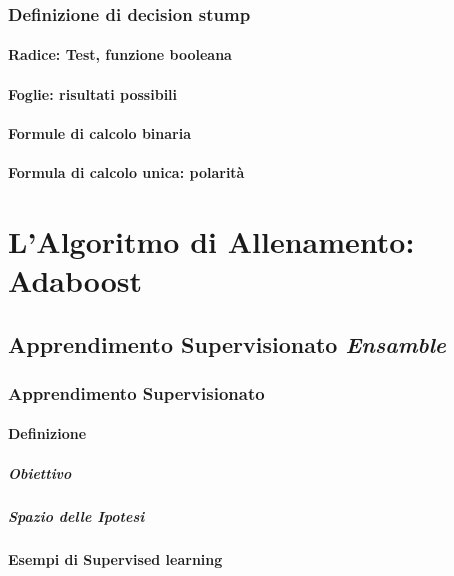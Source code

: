         \subsection{Definizione di decision stump}
            \subsubsection{Radice: Test, funzione booleana}
            \subsubsection{Foglie: risultati possibili}
            \subsubsection{Formule di calcolo binaria}
            \subsubsection{Formula di calcolo unica: polarità}

\chapter{L'Algoritmo di Allenamento: Adaboost}
\label{chap:adaboost}
    \section{Apprendimento Supervisionato \emph{Ensamble}}
    \label{sec:supervised_ensamble_learning}
        \subsection{Apprendimento Supervisionato}
        \label{sub:supervised_learning}
            \subsubsection{Definizione}
                \paragraph{Obiettivo}
                \paragraph{Spazio delle Ipotesi}
            \subsubsection{Esempi di Supervised learning}
